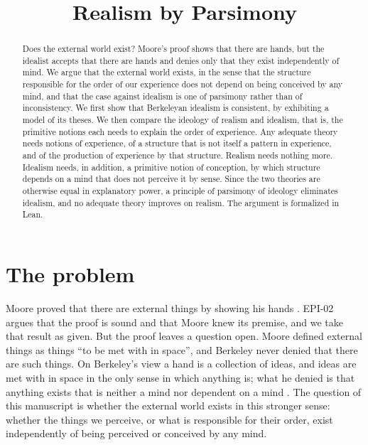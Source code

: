 \documentclass{situationist-preprint}
\title{Realism by Parsimony}
\begin{document}
\maketitle

\begin{abstract}
Does the external world exist? Moore's proof shows that there are hands, but the idealist accepts that there are hands and denies only that they exist independently of mind. We argue that the external world exists, in the sense that the structure responsible for the order of our experience does not depend on being conceived by any mind, and that the case against idealism is one of parsimony rather than of inconsistency. We first show that Berkeleyan idealism is consistent, by exhibiting a model of its theses. We then compare the ideology of realism and idealism, that is, the primitive notions each needs to explain the order of experience. Any adequate theory needs notions of experience, of a structure that is not itself a pattern in experience, and of the production of experience by that structure. Realism needs nothing more. Idealism needs, in addition, a primitive notion of conception, by which structure depends on a mind that does not perceive it by sense. Since the two theories are otherwise equal in explanatory power, a principle of parsimony of ideology eliminates idealism, and no adequate theory improves on realism. The argument is formalized in Lean.
\end{abstract}

\section{The problem}

Moore proved that there are external things by showing his hands \citep{Moore1939}. EPI-02 argues that the proof is sound and that Moore knew its premise, and we take that result as given. But the proof leaves a question open. Moore defined external things as things \enquote{to be met with in space}, and Berkeley never denied that there are such things. On Berkeley's view a hand is a collection of ideas, and ideas are met with in space in the only sense in which anything is; what he denied is that anything exists that is neither a mind nor dependent on a mind \citep[\S\S 1--7]{BerkeleyPrinciples}. The question of this manuscript is whether the external world exists in this stronger sense: whether the things we perceive, or what is responsible for their order, exist independently of being perceived or conceived by any mind.
\end{document}

